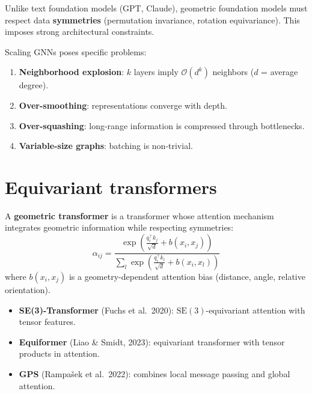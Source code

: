 \begin{remark}
Unlike text foundation models (GPT, Claude), geometric foundation
models must respect data \textbf{symmetries} (permutation invariance,
rotation equivariance). This imposes strong architectural constraints.
\end{remark}

\begin{proposition}
Scaling GNNs poses specific problems:
\begin{enumerate}
  \item \textbf{Neighborhood explosion}: $k$ layers imply
        $\mathcal{O}(d^k)$ neighbors ($d$ = average degree).
  \item \textbf{Over-smoothing}: representations converge with
        depth.
  \item \textbf{Over-squashing}: long-range information is
        compressed through bottlenecks.
  \item \textbf{Variable-size graphs}: batching is non-trivial.
\end{enumerate}
\end{proposition}

\section{Equivariant transformers}
\label{sec:equivariant_transformers}

\begin{definition}
A \textbf{geometric transformer} is a transformer whose attention
mechanism integrates geometric information while respecting
symmetries:
\[
  \alpha_{ij} = \frac{\exp\!\left(\frac{q_i^\top k_j}{\sqrt{d}}
  + b(x_i, x_j)\right)}{\sum_{l} \exp\!\left(
  \frac{q_i^\top k_l}{\sqrt{d}} + b(x_i, x_l)\right)}
\]
where $b(x_i, x_j)$ is a geometry-dependent attention bias
(distance, angle, relative orientation).
\end{definition}

\begin{example}
\begin{itemize}
  \item \textbf{SE(3)-Transformer} (Fuchs et al.\ 2020):
        $\mathrm{SE}(3)$-equivariant attention with tensor features.
  \item \textbf{Equiformer} (Liao \& Smidt, 2023): equivariant
        transformer with tensor products in attention.
  \item \textbf{GPS} (Rampa\v{s}ek et al.\ 2022): combines local
        message passing and global attention.
\end{itemize}
\end{example}

